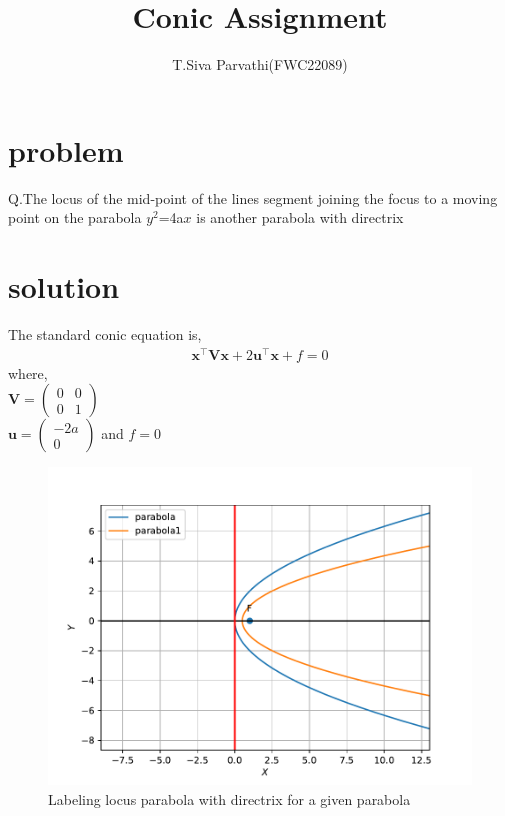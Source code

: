 \documentclass[journal,12pt,twocolumn]{IEEEtran}
\title{\mytitle}
\title{
Conic Assignment 
}
\author{T.Siva Parvathi(FWC22089)}
\newcommand{\myvec}[1]{\ensuremath{\begin{pmatrix}#1\end{pmatrix}}}
\let\vec\mathbf
\begin{document}
\maketitle
\tableofcontents
\bigskip


\section{\textbf{problem}}
Q.The locus of the mid-point of the lines segment joining the focus to a moving point on the parabola $y^2$=4a$x$ is another parabola with directrix

\section{\textbf{solution}}
The standard conic equation is,\\
\begin{align}
\label{eq:one}
\vec{x}^\top\vec{Vx}+2\vec{u}^\top\vec{x}+f=0
\end{align} 
 where,\\
$\vec{V}=\myvec{0&0 \\0&1}$\\ $\vec{u}=\myvec{-2a\\0}$ and $f=0$ \\


\begin{figure}[h]
    \centering
\includegraphics[width=\columnwidth]{cofig.pdf}
\caption{Labeling locus parabola with directrix for a given parabola}
    \label{fig:my_label}
\end{figure}
\end{document}
